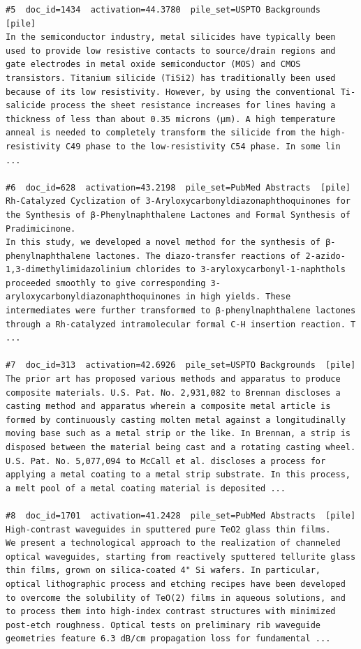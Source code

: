 \begin{verbatim}
#5  doc_id=1434  activation=44.3780  pile_set=USPTO Backgrounds  [pile]
In the semiconductor industry, metal silicides have typically been used to provide low resistive contacts to source/drain regions and gate electrodes in metal oxide semiconductor (MOS) and CMOS transistors. Titanium silicide (TiSi2) has traditionally been used because of its low resistivity. However, by using the conventional Ti-salicide process the sheet resistance increases for lines having a thickness of less than about 0.35 microns (μm). A high temperature anneal is needed to completely transform the silicide from the high-resistivity C49 phase to the low-resistivity C54 phase. In some lin ...

#6  doc_id=628  activation=43.2198  pile_set=PubMed Abstracts  [pile]
Rh-Catalyzed Cyclization of 3-Aryloxycarbonyldiazonaphthoquinones for the Synthesis of β-Phenylnaphthalene Lactones and Formal Synthesis of Pradimicinone.
In this study, we developed a novel method for the synthesis of β-phenylnaphthalene lactones. The diazo-transfer reactions of 2-azido-1,3-dimethylimidazolinium chlorides to 3-aryloxycarbonyl-1-naphthols proceeded smoothly to give corresponding 3-aryloxycarbonyldiazonaphthoquinones in high yields. These intermediates were further transformed to β-phenylnaphthalene lactones through a Rh-catalyzed intramolecular formal C-H insertion reaction. T ...

#7  doc_id=313  activation=42.6926  pile_set=USPTO Backgrounds  [pile]
The prior art has proposed various methods and apparatus to produce composite materials. U.S. Pat. No. 2,931,082 to Brennan discloses a casting method and apparatus wherein a composite metal article is formed by continuously casting molten metal against a longitudinally moving base such as a metal strip or the like. In Brennan, a strip is disposed between the material being cast and a rotating casting wheel.
U.S. Pat. No. 5,077,094 to McCall et al. discloses a process for applying a metal coating to a metal strip substrate. In this process, a melt pool of a metal coating material is deposited ...

#8  doc_id=1701  activation=41.2428  pile_set=PubMed Abstracts  [pile]
High-contrast waveguides in sputtered pure TeO2 glass thin films.
We present a technological approach to the realization of channeled optical waveguides, starting from reactively sputtered tellurite glass thin films, grown on silica-coated 4" Si wafers. In particular, optical lithographic process and etching recipes have been developed to overcome the solubility of TeO(2) films in aqueous solutions, and to process them into high-index contrast structures with minimized post-etch roughness. Optical tests on preliminary rib waveguide geometries feature 6.3 dB/cm propagation loss for fundamental ...


\end{verbatim}
